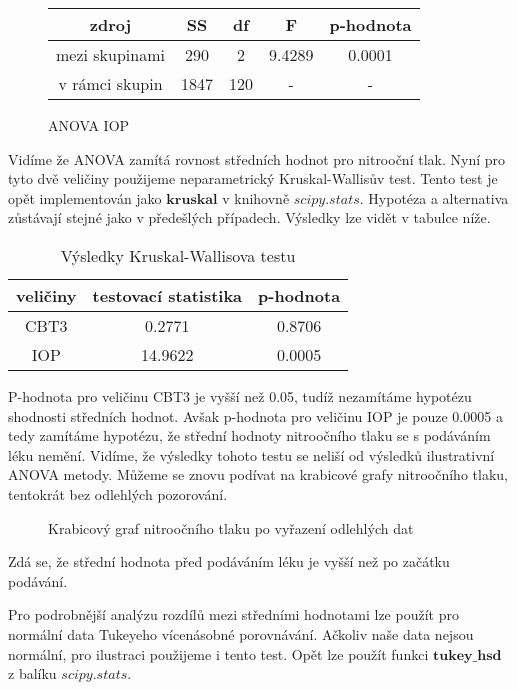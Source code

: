 \documentclass{article}
\begin{document}
\begin{figure}[H]
  \centering
    \begin{tabular}{|ccccc|}
      \hline
      zdroj & SS & df & F & p-hodnota \\
      \hline
      mezi skupinami & 290 & 2 & 9.4289 & 0.0001 \\
      v rámci skupin & 1847 & 120 & - & - \\
      \hline
    \end{tabular}
    \caption{ANOVA IOP}
\end{figure}

Vidíme že ANOVA zamítá rovnost středních hodnot pro nitrooční tlak.
Nyní pro tyto dvě veličiny použijeme neparametrický Kruskal-Wallisův test.
Tento test je opět implementován jako $\mathbf{kruskal}$ v knihovně $scipy.stats$.
Hypotéza a alternativa zůstávají stejné jako v předešlých případech.
Výsledky lze vidět v tabulce níže.

\begin{table}[H]
  \small
  \centering
  \caption{Výsledky Kruskal-Wallisova testu}
  \begin{tabular}{|ccc|}
    \hline
    veličiny & testovací statistika & p-hodnota\\
    \hline
    CBT3 & 0.2771 & 0.8706\\
    IOP & 14.9622 & 0.0005\\
    \hline
  \end{tabular}
\end{table}

P-hodnota pro veličinu CBT3 je vyšší než 0.05, tudíž nezamítáme hypotézu shodnosti středních hodnot.
Avšak p-hodnota pro veličinu IOP je pouze 0.0005 a tedy zamítáme hypotézu, že střední hodnoty nitroočního tlaku se s podáváním léku nemění.
Vidíme, že výsledky tohoto testu se neliší od výsledků ilustrativní ANOVA metody.
Můžeme se znovu podívat na krabicové grafy nitroočního tlaku, tentokrát bez odlehlých pozorování.

\begin{figure}[H]
  \centering
    
    \caption{Krabicový graf nitroočního tlaku po vyřazení odlehlých dat}
\end{figure}

Zdá se, že střední hodnota před podáváním léku je vyšší než po začátku podávání.

Pro podrobnější analýzu rozdílů mezi středními hodnotami lze použít pro normální data Tukeyeho vícenásobné porovnávání.
Ačkoliv naše data nejsou normální, pro ilustraci použijeme i tento test.
Opět lze použít funkci $\mathbf{tukey\_hsd}$ z balíku $scipy.stats$.
\end{document}
